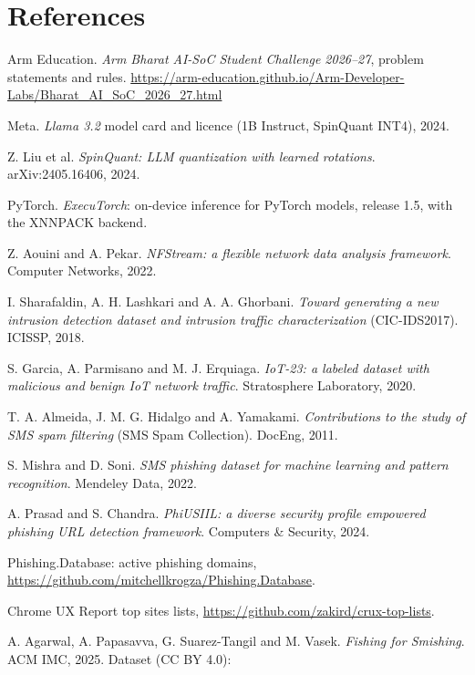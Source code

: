 \documentclass[11pt,a4paper]{article}
\begin{document}
\section*{References}
\small
\begin{enumerate}[label={[\arabic*]}, leftmargin=*, itemsep=1pt]
  \item Arm Education. \emph{Arm Bharat AI-SoC Student Challenge 2026--27}, problem statements and rules.
        \url{https://arm-education.github.io/Arm-Developer-Labs/Bharat_AI_SoC_2026_27.html}
  \item Meta. \emph{Llama 3.2} model card and licence (1B Instruct, SpinQuant INT4), 2024.
  \item Z. Liu et al. \emph{SpinQuant: LLM quantization with learned rotations}. arXiv:2405.16406, 2024.
  \item PyTorch. \emph{ExecuTorch}: on-device inference for PyTorch models, release 1.5, with the XNNPACK backend.
  \item Z. Aouini and A. Pekar. \emph{NFStream: a flexible network data analysis framework}. Computer Networks, 2022.
  \item I. Sharafaldin, A. H. Lashkari and A. A. Ghorbani. \emph{Toward generating a new intrusion detection dataset and
        intrusion traffic characterization} (CIC-IDS2017). ICISSP, 2018.
  \item S. Garcia, A. Parmisano and M. J. Erquiaga. \emph{IoT-23: a labeled dataset with malicious and benign IoT network
        traffic}. Stratosphere Laboratory, 2020.
  \item T. A. Almeida, J. M. G. Hidalgo and A. Yamakami. \emph{Contributions to the study of SMS spam filtering}
        (SMS Spam Collection). DocEng, 2011.
  \item S. Mishra and D. Soni. \emph{SMS phishing dataset for machine learning and pattern recognition}. Mendeley Data, 2022.
  \item A. Prasad and S. Chandra. \emph{PhiUSIIL: a diverse security profile empowered phishing URL detection framework}.
        Computers \& Security, 2024.
  \item Phishing.Database: active phishing domains, \url{https://github.com/mitchellkrogza/Phishing.Database}.
  \item Chrome UX Report top sites lists, \url{https://github.com/zakird/crux-top-lists}.
  \item A. Agarwal, A. Papasavva, G. Suarez-Tangil and M. Vasek. \emph{Fishing for Smishing}. ACM IMC, 2025. Dataset (CC BY 4.0):

\end{enumerate}
\end{document}
